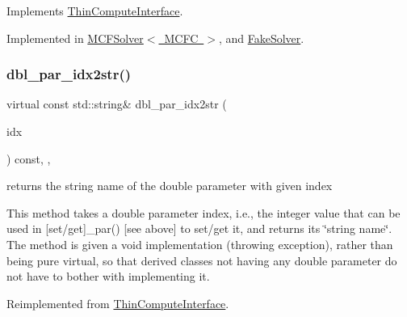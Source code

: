 Implements \mbox{\hyperlink{class_s_m_spp__di__unipi__it_1_1_thin_compute_interface_a00fd6363d98ea46bcc273842b327d050}{Thin\+Compute\+Interface}}.



Implemented in \mbox{\hyperlink{class_s_m_spp__di__unipi__it_1_1_m_c_f_solver_afc8ff54ab05d22f4cca0fb0bfbeb7a49}{M\+C\+F\+Solver$<$ M\+C\+F\+C $>$}}, and \mbox{\hyperlink{class_s_m_spp__di__unipi__it_1_1_fake_solver_afc8ff54ab05d22f4cca0fb0bfbeb7a49}{Fake\+Solver}}.

\mbox{\label{class_s_m_spp__di__unipi__it_1_1_solver_a93f1297e7910e91cc18b303376191026}} 
\subsubsection{\texorpdfstring{dbl\+\_\+par\+\_\+idx2str()}{dbl\_par\_idx2str()}}
{\footnotesize\ttfamily virtual const std\+::string\& dbl\+\_\+par\+\_\+idx2str (\begin{DoxyParamCaption}\item[{const \mbox{\hyperlink{class_s_m_spp__di__unipi__it_1_1_thin_compute_interface_aa3d710629ad8c434286726ad810c3b47}{idx\+\_\+type}}}]{idx }\end{DoxyParamCaption}) const\hspace{0.3cm}{\ttfamily [inline]}, {\ttfamily [override]}, {\ttfamily [virtual]}}



returns the string name of the double parameter with given index 

This method takes a double parameter index, i.\+e., the integer value that can be used in \mbox{[}set/get\mbox{]}\+\_\+par() \mbox{[}see above\mbox{]} to set/get it, and returns its \char`\"{}string name\char`\"{}. The method is given a void implementation (throwing exception), rather than being pure virtual, so that derived classes not having any double parameter do not have to bother with implementing it. 

Reimplemented from \mbox{\hyperlink{class_s_m_spp__di__unipi__it_1_1_thin_compute_interface_a1be0e4ca13f9253674bc4fa7b67fe40e}{Thin\+Compute\+Interface}}.



